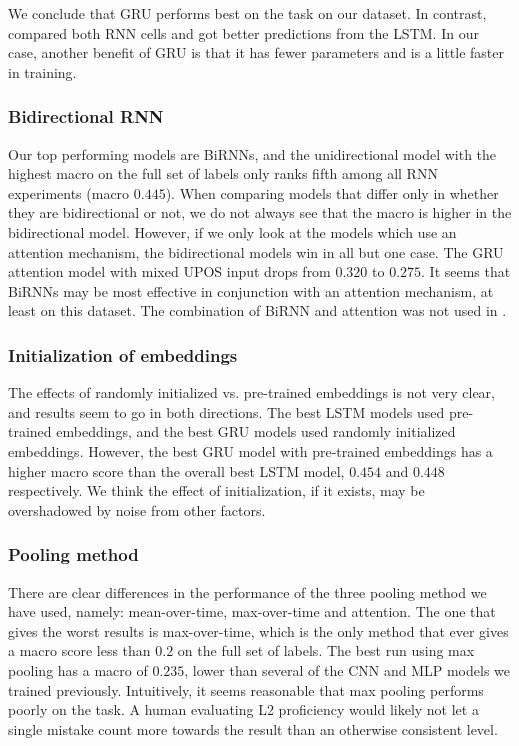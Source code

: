 We conclude that GRU performs best on the task on our dataset. In contrast,
\textcite{taghipour16} compared both RNN cells and got better predictions
from the \ac{LSTM}. In our case, another benefit of GRU is that it has fewer
parameters and is a little faster in training.


\subsubsection{Bidirectional RNN}

Our top performing models are BiRNNs, and the unidirectional model with the
highest macro \FI on the full set of labels only ranks fifth among all RNN
experiments (macro \FI $0.445$). When comparing models that differ only in
whether they are bidirectional or not, we do not always see that the macro
\FI is higher in the bidirectional model. However, if we only look at the
models which use an attention mechanism, the bidirectional models win in all
but one case. The GRU attention model with mixed UPOS input drops from
$0.320$ to $0.275$. It seems that BiRNNs may be most effective in conjunction
with an attention mechanism, at least on this dataset. The combination of
BiRNN and attention was not used in \textcite{taghipour16}.


\subsubsection{Initialization of embeddings}

The effects of randomly initialized vs. pre-trained embeddings is not very
clear, and results seem to go in both directions. The best LSTM models used
pre-trained embeddings, and the best GRU models used randomly initialized
embeddings. However, the best GRU model with pre-trained embeddings has a
higher macro \FI score than the overall best LSTM model, $0.454$ and $0.448$
respectively. We think the effect of initialization, if it exists, may be
overshadowed by noise from other factors.


\subsubsection{Pooling method}

There are clear differences in the performance of the three pooling method we
have used, namely: mean-over-time, max-over-time and attention. The one that
gives the worst results is max-over-time, which is the only method that ever
gives a macro \FI score less than $0.2$ on the full set of labels. The best
run using max pooling has a macro \FI of $0.235$, lower than several of the
CNN and MLP models we trained previously. Intuitively, it seems reasonable
that max pooling performs poorly on the task. A human evaluating \ac{L2}
proficiency would likely not let a single mistake count more towards the
result than an otherwise consistent level.

